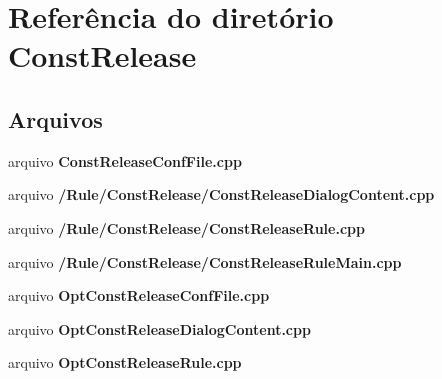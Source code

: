 \section{Referência do diretório Const\+Release}
\label{dir_4409fb68e8fdd58d5185fd7431e5cc2a}
\subsection*{Arquivos}
\begin{DoxyCompactItemize}
\item 
arquivo {\bf Const\+Release\+Conf\+File.\+cpp}
\item 
arquivo {\bf /\+Rule/\+Const\+Release/\+Const\+Release\+Dialog\+Content.\+cpp}
\item 
arquivo {\bf /\+Rule/\+Const\+Release/\+Const\+Release\+Rule.\+cpp}
\item 
arquivo {\bf /\+Rule/\+Const\+Release/\+Const\+Release\+Rule\+Main.\+cpp}
\item 
arquivo {\bf Opt\+Const\+Release\+Conf\+File.\+cpp}
\item 
arquivo {\bf Opt\+Const\+Release\+Dialog\+Content.\+cpp}
\item 
arquivo {\bf Opt\+Const\+Release\+Rule.\+cpp}
\end{DoxyCompactItemize}
